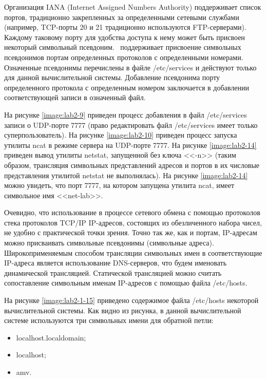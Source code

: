 	Организация IANA (Internet Assigned Numbers Authority) поддерживает список портов, традиционно закрепленных
	за определенными сетевыми службами (например, TCP-порты 20 и 21 традиционно используются FTP-серверами). Каждому
	таковому порту для удобства доступа к нему может быть присвоен некоторый символьный псевдоним.
	\linux\ поддерживает присвоение символьных псевдонимов портам определенных протоколов с определенными номерами.
	Означенные псевдонимы перечислены в файле /etc/services и действуют только для данной вычислительной системы.
	Добавление псевдонима порту определенного протокола с определенным номером заключается в добавлении
	соответствующей записи в означенный файл.

	На рисунке \ref{image:lab2-9} приведен процесс добавления в файл /etc/services записи о UDP-порте 7777 (право редактировать файл /etc/services имеет только
	суперпользователь). На рисунке \ref{image:lab2-10} приведен процесс запуска утилиты ncat
	в режиме сервера на UDP-порте 7777. На рисунке \ref{image:lab2-14} приведен вывод утилиты netstat, запущенной без ключа <<-n>>
	(таким образом, трансляция символьных представлений адресов и портов в их числовые представления утилитой netstat не выполнялась).
	На рисунке \ref{image:lab2-14} можно увидеть, что порт 7777, на котором запущена утилита ncat, имеет символьное имя <<net-lab>>.


	Очевидно, что использование в процессе сетевого обмена с помощью протоколов стека протоколов TCP/IP IP-адресов, состоящих из обезличенного набора чисел,
	не удобно с практической точки зрения. Точно так же, как и портам, IP-адресам можно присваивать символьные псевдонимы (символьные адреса).
	Широкоприменяемым способом трансляции символьных имен в соответствующие IP-адреса является использование DNS-серверов, что будем именовать
	динамической трансляцией. Статической трансляцией можно считать сопоставление символьным именам IP-адресов с помощью файла /etc/hosts.

	На рисунке \ref{image:lab2-1-15} приведено содержимое файла /etc/hosts некоторой вычислительной системы.
	Как видно из рисунка, в данной вычислительной системе используются три символьных имени для обратной петли:

	\begin{itemize}

		\item localhost.localdomain;
		\item localhost;
		\item amv.

	\end{itemize}

